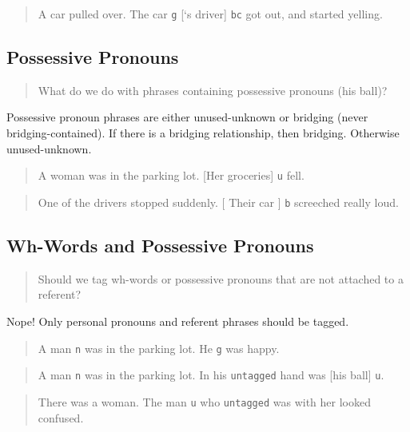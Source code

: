 \documentclass[
]{book}
\begin{document}
\begin{quote}
A car pulled over.
The car \texttt{g} {[}`s driver{]} \texttt{bc} got out, and started yelling.
\end{quote}

\hypertarget{possessive-pronouns}{%
\subsection{Possessive Pronouns}\label{possessive-pronouns}}

\begin{quote}
What do we do with phrases containing possessive pronouns (his ball)?
\end{quote}

Possessive pronoun phrases are either unused-unknown or bridging (never bridging-contained).
If there is a bridging relationship, then bridging. Otherwise unused-unknown.

\begin{quote}
A woman was in the parking lot.
{[}Her groceries{]} \texttt{u} fell.
\end{quote}

\begin{quote}
One of the drivers stopped suddenly.
{[} Their car {]} \texttt{b} screeched really loud.
\end{quote}

\hypertarget{wh-words-and-possessive-pronouns}{%
\subsection{Wh-Words and Possessive Pronouns}\label{wh-words-and-possessive-pronouns}}

\begin{quote}
Should we tag wh-words or possessive pronouns that are not attached to a referent?
\end{quote}

Nope! Only personal pronouns and referent phrases should be tagged.

\begin{quote}
A man \texttt{n} was in the parking lot.
He \texttt{g} was happy.
\end{quote}

\begin{quote}
A man \texttt{n} was in the parking lot.
In his \texttt{untagged} hand was {[}his ball{]} \texttt{u}.
\end{quote}

\begin{quote}
There was a woman.
The man \texttt{u} who \texttt{untagged} was with her looked confused.
\end{quote}
\end{document}
